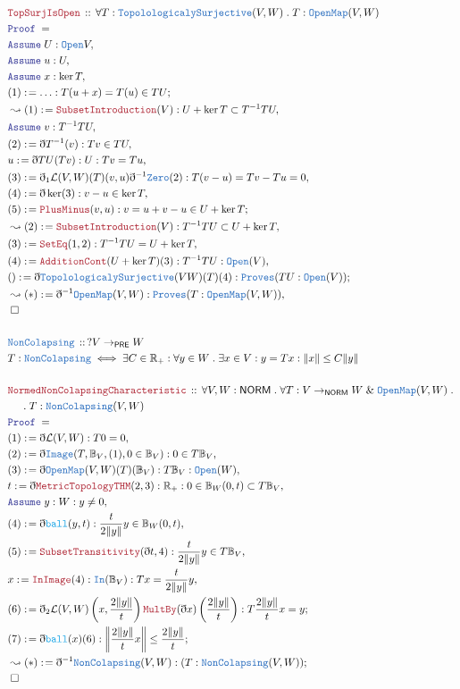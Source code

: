 \documentclass[12pt]{scrartcl}
\newcommand{\TYPE}[1]{\textcolor{NavyBlue}{\mathtt{#1}}}
\newcommand{\FUNC}[1]{\textcolor{Cerulean}{\mathtt{#1}}}
\newcommand{\LOGIC}[1]{\textcolor{Blue}{\mathtt{#1}}}
\newcommand{\THM}[1]{\textcolor{Maroon}{\mathtt{#1}}}
\renewcommand{\.}{\; . \;}
\newcommand{\de}{: \kern 0.1pc =}
\newcommand{\Theorem}[2]{& \THM{#1} \, :: \, #2 \\ & \Proof = \\ }
\newcommand{\DeclareType}[2]{& \TYPE{#1} \, :: \, #2 \\}
\newcommand{\DefineType}[3]{& #1 : \TYPE{#2} \iff #3 \\}
\newcommand{\NewLine}{\\ & \kern 1pc}
\newcommand{\Page}[1]{\begin{align*} #1 \end{align*} \newpage   }
\newcommand{ \bd }{ \ByDef }
\renewcommand{\And}{\; \& \;}
\newcommand{\Reals}{\mathbb{R} }
\newcommand{\Say}[3]{& #1 \de #2 : #3, \\}
\newcommand{\Conclude}[3]{& #1 \de #2 : #3; \\}
\newcommand{\Derive}[3]{& \leadsto #1 \de #2 : #3, \\}
\newcommand{\DeriveConclude}[3]{& \leadsto #1 \de #2 : #3 ; \\}
\newcommand{\A}{\LOGIC{Assume} \;}
\newcommand{\Assume}[2]{& \A #1 : #2, \\}
\newcommand{\QED}{\; \square}
\newcommand{\EndProof}{& \QED \\}
\newcommand{\ByDef}{\eth}
\newcommand{\Proof}{\LOGIC{Proof} \; }
\newcommand{\PRE}{\mathsf{PRE}} %
\newcommand{\NORM}{\mathsf{NORM}} %
\begin{document}
  \Page{
  \Theorem{TopSurjIsOpen}{ \forall T :  \TYPE{TopolologicalySurjective}(V, W) \. T : \TYPE{OpenMap}(V,W)}
  \Assume{U}{\TYPE{Open}{V}}
  \Assume{u}{ U}
  \Assume{x}{\ker T}
  \Conclude{ (1) }{ \ldots }{T(u + x) = T(u) \in TU }
  \Derive{ (1) }{\THM{SubsetIntroduction}(V)}{ U + \ker T \subset T^{-1}TU }
  \Assume{v}{T^{-1}TU}
  \Say{(2)}{\bd T^{-1}(v)}{Tv \in TU}
  \Say{ u }{ \bd TU (Tv)}{ U : Tv = Tu }
  \Say{(3)}{ \bd_1 \mathcal{L}(V,W)(T)(v,u)\bd^{-1}\TYPE{Zero}(2)  }{  T(v - u) = Tv - Tu = 0 }
  \Say{(4)}{\bd \ker (3)}{v - u \in \ker T}
  \Conclude{(5)}{ \THM{PlusMinus}(v,u)  }{ v = u + v - u \in U + \ker T }
  \Derive{ (2) }{\THM{SubsetIntroduction}(V)}{ T^{-1}TU \subset U + \ker T }
  \Say{ (3) }{ \THM{SetEq}(1,2) }{T^{-1}TU = U + \ker T }
  \Say{ (4) }{ \THM{AdditionCont}(U + \ker T)(3)}{ T^{-1}TU : \TYPE{Open}(V)  }
  \Conclude{ ( ) }
  { \bd  \TYPE{TopolologicalySurjective}(V W)(T)(4)  }{ \TYPE{Proves}( TU : \TYPE{Open}(V))      }
  \Derive{ (*)  }
  {  \bd^{-1} \TYPE{OpenMap}(V,W) }{ \TYPE{Proves}(T : \TYPE{OpenMap}(V,W)) }
  \EndProof
  \\ 
  \DeclareType{NonColapsing}{? V \to_{\PRE} W}
  \DefineType{T}{NonColapsing}{ \exists C \in \Reals_+ : \forall y \in W \. \exists x \in V
  : y = Tx : \| x \| \le C\| y \|  
  }
  \\
  \Theorem{NormedNonColapsingCharacteristic}{ \forall V,W : \NORM \. 
  \forall T : V \to_\NORM W  \And \TYPE{OpenMap}(V,W) \. \NewLine \.
   T : \TYPE{NonColapsing}(V,W)
  }
  \Say{(1)}{ \bd\mathcal{L}(V,W)}{T0 = 0}
  \Say{(2)}{ \bd\TYPE{Image}(T,\mathbb{B}_V, (1), 0 \in \mathbb{B}_V) }{ 0 \in T\mathbb{B}_V }
  \Say{(3)}{ \bd\TYPE{OpenMap}(V,W)(T)(\mathbb{B}_V)}{ T\mathbb{B}_V : \TYPE{Open}(W) }
  \Say{t}{ \bd\THM{MetricTopologyTHM}(2,3)}{\Reals_+ : 0 \in \mathbb{B}_W(0,t) \subset T\mathbb{B}_V}
  \Assume{y}{W : y \neq 0}  
  \Say{(4)}{\bd \FUNC{ball}(y, t)}{ \frac{t}{2 \| y \|} y \in \mathbb{B}_W(0,t) }
  \Say{(5)}{\THM{SubsetTransitivity}(\bd t, 4)}{\frac{t}{2 \| y \|}y \in T\mathbb{B}_V}   
  \Say{x}{ \THM{InImage}(4) }{ \TYPE{In}(\mathbb{B}_V) : Tx = \frac{t}{2 \| y \|}y  }
  \Conclude{(6)}{ \bd_2 \mathcal{L}(V,W)\left(x, \frac{2 \| y \|}{t} \right) \THM{MultBy}(\bd x)\left(  \frac{2 \| y \|}{t} \right) }{ T \frac{2 \| y \|}{t} x = y  }
      \Conclude{(7)}{  \bd \FUNC{ball}(x)(6)  }{ \left \|  \frac{2 \| y \|}{t} x    \right \| \le \frac{2 \|y \| }{t} }
     \DeriveConclude{(*)}{\bd^{-1} \TYPE{NonColapsing}(V,W)}{(T : \TYPE{NonColapsing}(V,W) )}
\EndProof    
       }
\end{document}
